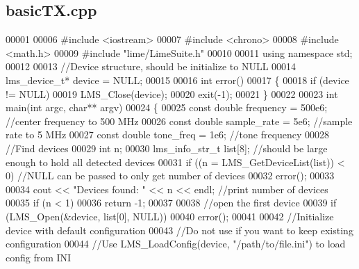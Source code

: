 \subsection{basic\+T\+X.\+cpp}
\label{basicTX_8cpp_source}

\begin{DoxyCode}
00001 
00006 \textcolor{preprocessor}{#include <iostream>}
00007 \textcolor{preprocessor}{#include <chrono>}
00008 \textcolor{preprocessor}{#include <math.h>}
00009 \textcolor{preprocessor}{#include "lime/LimeSuite.h"}
00010 
00011 \textcolor{keyword}{using namespace }std;
00012 
00013 \textcolor{comment}{//Device structure, should be initialize to NULL}
00014 lms_device_t* device = NULL;
00015 
00016 \textcolor{keywordtype}{int} error()
00017 \{
00018     \textcolor{keywordflow}{if} (device != NULL)
00019     LMS_Close(device);
00020     exit(-1);
00021 \}
00022 
00023 \textcolor{keywordtype}{int} main(\textcolor{keywordtype}{int} argc, \textcolor{keywordtype}{char}** argv)
00024 \{
00025     \textcolor{keyword}{const} \textcolor{keywordtype}{double} frequency = 500e6;  \textcolor{comment}{//center frequency to 500 MHz}
00026     \textcolor{keyword}{const} \textcolor{keywordtype}{double} sample\_rate = 5e6;    \textcolor{comment}{//sample rate to 5 MHz}
00027     \textcolor{keyword}{const} \textcolor{keywordtype}{double} tone\_freq = 1e6; \textcolor{comment}{//tone frequency}
00028     \textcolor{comment}{//Find devices}
00029     \textcolor{keywordtype}{int} n;
00030     lms_info_str_t list[8]; \textcolor{comment}{//should be large enough to hold all detected devices}
00031     \textcolor{keywordflow}{if} ((n = LMS_GetDeviceList(list)) < 0) \textcolor{comment}{//NULL can be passed to only get number of devices}
00032         error();
00033 
00034     cout << \textcolor{stringliteral}{"Devices found: "} << n << endl; \textcolor{comment}{//print number of devices}
00035     \textcolor{keywordflow}{if} (n < 1)
00036         \textcolor{keywordflow}{return} -1;
00037 
00038     \textcolor{comment}{//open the first device}
00039     \textcolor{keywordflow}{if} (LMS_Open(&device, list[0], NULL))
00040         error();
00041 
00042     \textcolor{comment}{//Initialize device with default configuration}
00043     \textcolor{comment}{//Do not use if you want to keep existing configuration}
00044     \textcolor{comment}{//Use LMS\_LoadConfig(device, "/path/to/file.ini") to load config from INI}

\end{DoxyCode}
